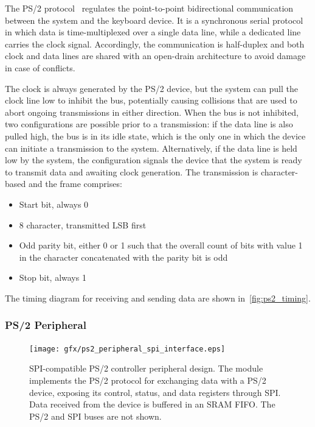 \documentclass[]{article}
\begin{document}
The PS/2 protocol~\cite{ps2_controller,ps2_device} regulates the point-to-point bidirectional communication between the system and the keyboard device. It is a synchronous serial protocol in which data is time-multiplexed over a single data line, while a dedicated line carries the clock signal. Accordingly, the communication is half-duplex and both clock and data lines are shared with an open-drain architecture to avoid damage in case of conflicts.

The clock is always generated by the PS/2 device, but the system can pull the clock line low to inhibit the bus, potentially causing collisions that are used to abort ongoing transmissions in either direction. When the bus is not inhibited, two configurations are possible prior to a transmission: if the data line is also pulled high, the bus is in its idle state, which is the only one in which the device can initiate a transmission to the system. Alternatively, if the data line is held low by the system, the configuration signals the device that the system is ready to transmit data and awaiting clock generation.
The transmission is character-based and the frame comprises:
\begin{itemize}
    \item Start bit, always 0
    \item \qty{8}{\bit} character, transmitted LSB first
    \item Odd parity bit, either 0 or 1 such that the overall count of bits with value 1 in the character concatenated with the parity bit is odd
    \item Stop bit, always 1
\end{itemize}
The timing diagram for receiving and sending data are shown in~\cref{fig:ps2_timing}.

\subsubsection{PS/2 Peripheral}

\begin{figure}
    \centering
    \texttt{[image: gfx/ps2\_peripheral\_spi\_interface.eps]}
    \caption{SPI-compatible PS/2 controller peripheral design. The module implements the PS/2 protocol for exchanging data with a PS/2 device, exposing its control, status, and data registers through SPI. Data received from the device is buffered in an SRAM FIFO. The PS/2 and SPI buses are not shown.}
    \label{fig:ps2_peripheral}
\end{figure}
\end{document}
